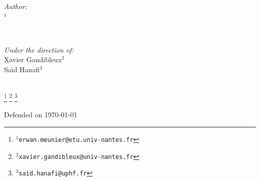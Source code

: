 \begin{titlepage}
\begin{minipage}{0.4\textwidth}
\begin{flushleft} \large
\emph{Author:}\\
\@author$^1$ %

\end{flushleft}
\end{minipage}
~
\begin{minipage}{0.4\textwidth}
\begin{flushright} \large
\emph{Under the direction of:} \\
Xavier Gandibleux$^2$ \\
Saïd Hanafi$^3$\\[1.2em]
\end{flushright}
\end{minipage}\\[2cm]
\let\thefootnote\relax\footnote{$^1$\texttt{erwan.meunier@etu.univ-nantes.fr}}
\let\thefootnote\relax\footnote{$^2$\texttt{xavier.gandibleux@univ-nantes.fr}}
\let\thefootnote\relax\footnote{$^3$\texttt{said.hanafi@uphf.fr}}
\makeatother


{\large Defended on \today}\\[2cm] %

\vfill %

\end{titlepage}